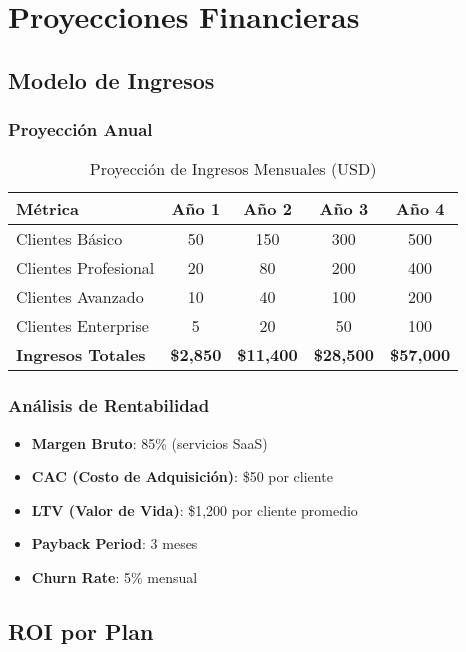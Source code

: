 \documentclass[12pt,a4paper]{article}
\begin{document}
\section{Proyecciones Financieras}

\subsection{Modelo de Ingresos}

\subsubsection{Proyección Anual}

\begin{table}[H]
\centering
\begin{tabular}{|l|c|c|c|c|}
\hline
\textbf{Métrica} & \textbf{Año 1} & \textbf{Año 2} & \textbf{Año 3} & \textbf{Año 4} \\
\hline
Clientes Básico & 50 & 150 & 300 & 500 \\
\hline
Clientes Profesional & 20 & 80 & 200 & 400 \\
\hline
Clientes Avanzado & 10 & 40 & 100 & 200 \\
\hline
Clientes Enterprise & 5 & 20 & 50 & 100 \\
\hline
\textbf{Ingresos Totales} & \textbf{\$2,850} & \textbf{\$11,400} & \textbf{\$28,500} & \textbf{\$57,000} \\
\hline
\end{tabular}
\caption{Proyección de Ingresos Mensuales (USD)}
\end{table}

\subsubsection{Análisis de Rentabilidad}

\begin{itemize}
    \item \textbf{Margen Bruto}: 85\% (servicios SaaS)
    \item \textbf{CAC (Costo de Adquisición)}: \$50 por cliente
    \item \textbf{LTV (Valor de Vida)}: \$1,200 por cliente promedio
    \item \textbf{Payback Period}: 3 meses
    \item \textbf{Churn Rate}: 5\% mensual
\end{itemize}

\subsection{ROI por Plan}
\end{document}
